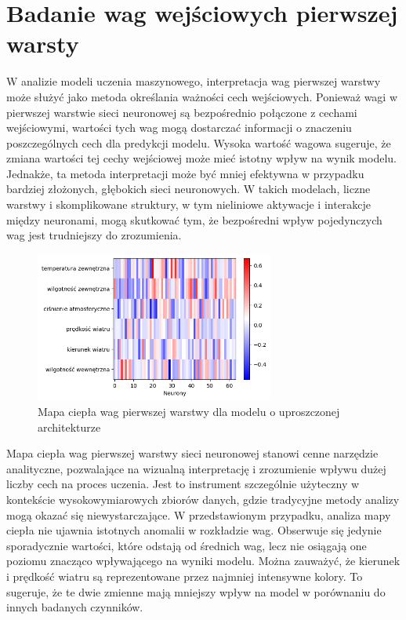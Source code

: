\documentclass[a4paper,twoside,12pt]{book}
\begin{document}
\section{Badanie wag wejściowych pierwszej warsty}
W analizie modeli uczenia maszynowego, interpretacja wag pierwszej warstwy może służyć jako metoda określania ważności cech wejściowych. Ponieważ wagi w pierwszej warstwie sieci neuronowej są bezpośrednio połączone z cechami wejściowymi, wartości tych wag mogą dostarczać informacji o znaczeniu poszczególnych cech dla predykcji modelu. Wysoka wartość wagowa sugeruje, że zmiana wartości tej cechy wejściowej może mieć istotny wpływ na wynik modelu. Jednakże, ta metoda interpretacji może być mniej efektywna w przypadku bardziej złożonych, głębokich sieci neuronowych. W takich modelach, liczne warstwy i skomplikowane struktury, w tym nieliniowe aktywacje i interakcje między neuronami, mogą skutkować tym, że bezpośredni wpływ pojedynczych wag jest trudniejszy do zrozumienia.
\begin{figure}[!h]
  \centering
  \includegraphics[width=0.7\textwidth]{img/heatmap1.png}
  \caption{Mapa ciepła wag pierwszej warstwy dla modelu o uproszczonej architekturze}
  \label{fig:etykieta-rysunku}
\end{figure}

Mapa ciepła wag pierwszej warstwy sieci neuronowej stanowi cenne narzędzie analityczne, pozwalające na wizualną interpretację i zrozumienie wpływu dużej liczby cech na proces uczenia. Jest to instrument szczególnie użyteczny w kontekście wysokowymiarowych zbiorów danych, gdzie tradycyjne metody analizy mogą okazać się niewystarczające. W przedstawionym przypadku, analiza mapy ciepła nie ujawnia istotnych anomalii w rozkładzie wag. Obserwuje się jedynie sporadycznie wartości, które odstają od średnich wag, lecz nie osiągają one poziomu znacząco wpływającego na wyniki modelu. Można zauważyć, że kierunek i prędkość wiatru są reprezentowane przez najmniej intensywne kolory. To sugeruje, że te dwie zmienne mają mniejszy wpływ na model w porównaniu do innych badanych czynników.
\end{document}
